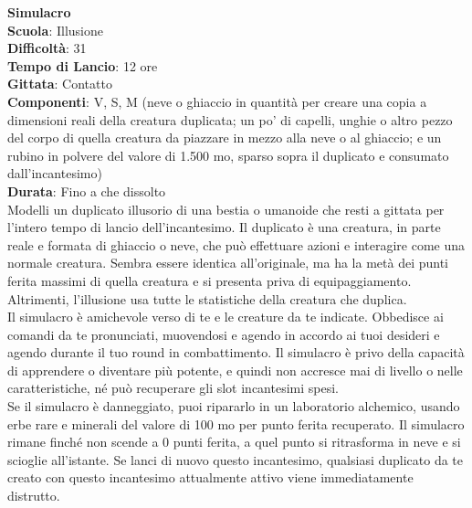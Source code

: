 \begin{multicols}{2}
\medskip\textbf{Simulacro}\\
\textbf{Scuola}: Illusione\\
\textbf{Difficoltà}: 31\\
\textbf{Tempo di Lancio}: 12 ore\\
\textbf{Gittata}: Contatto\\
\textbf{Componenti}: V, S, M (neve o ghiaccio in quantità per creare una copia a dimensioni reali della creatura duplicata; un po' di capelli, unghie o altro pezzo del corpo di quella creatura da piazzare in mezzo alla neve o al ghiaccio; e un rubino in polvere del valore di 1.500 mo, sparso sopra il duplicato e consumato dall'incantesimo)\\
\textbf{Durata}: Fino a che dissolto\\
Modelli un duplicato illusorio di una bestia o umanoide che resti a gittata per l'intero tempo di lancio dell'incantesimo. Il duplicato è una creatura, in parte reale e formata di ghiaccio o neve, che può effettuare azioni e interagire come una normale creatura. Sembra essere identica all'originale, ma ha la metà dei punti ferita massimi di quella creatura e si presenta priva di equipaggiamento. Altrimenti, l'illusione usa tutte le statistiche della creatura che duplica.\\
Il simulacro è amichevole verso di te e le creature da te indicate. Obbedisce ai comandi da te pronunciati, muovendosi e agendo in accordo ai tuoi desideri e agendo durante il tuo round in combattimento. Il simulacro è privo della capacità di apprendere o diventare più potente, e quindi non accresce mai di livello o nelle caratteristiche, né può recuperare gli slot incantesimi spesi.\\
Se il simulacro è danneggiato, puoi ripararlo in un laboratorio alchemico, usando erbe rare e minerali del valore di 100 mo per punto ferita recuperato. Il simulacro rimane finché non scende a 0 punti ferita, a quel punto si ritrasforma in neve e si scioglie all'istante. Se lanci di nuovo questo incantesimo, qualsiasi duplicato da te creato con questo incantesimo attualmente attivo viene immediatamente distrutto.


\end{multicols}
